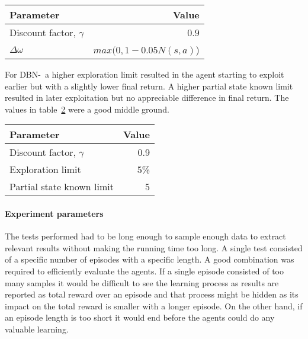 \begin{table}[H]
    \centering
    \label{tab:mbie_realistic_params}
    \begin{tabular}{lr}
     \toprule
     Parameter & Value \\
     \midrule
     Discount factor, $\gamma$ & 0.9 \\
     $\Delta \omega$ & $max(0,1 - 0.05 N(s,a)$) \\
     \bottomrule
    \end{tabular}
\end{table}

For DBN-\etre\ a higher exploration limit resulted in the agent starting to
exploit earlier but with a slightly lower final return. A higher partial state
known limit resulted in later exploitation but no appreciable difference in
final return. The values in table~\ref{tab:dbne3_params} were a good middle
ground.

\begin{table}[H]
\label{tab:dbne3_params}
\centering
\begin{tabular}{lr}
 \toprule
 Parameter & Value \\
 \midrule
 Discount factor, $\gamma$ & 0.9 \\
 Exploration limit & 5\% \\
 Partial state known limit & 5 \\
 \bottomrule
\end{tabular}
\end{table}

\paragraph{Experiment parameters}

The tests performed had to be long enough to sample enough data to extract
relevant results without making the running time too long. A single test
consisted of a specific number of episodes with a specific length. A good
combination was required to efficiently evaluate the agents. If a single
episode consisted of too many samples it would be difficult to see the learning
process as results are reported as total reward over an episode and that
process might be hidden as its impact on the total reward is smaller with a
longer episode. On the other hand, if an episode length is too short it would
end before the agents could do any valuable learning.

